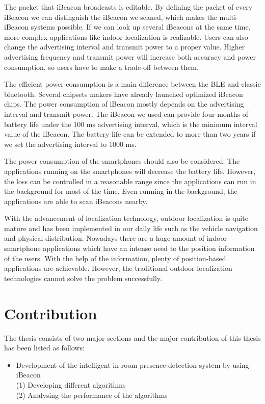 \documentclass[12pt]{report}
\begin{document}
The packet that iBeacon broadcasts is editable. By defining the packet of every iBeacon we can distinguish the iBeacon we scaned, which makes the multi-iBeacon systems possible. If we can look up several iBeacons at the same time, more complex applications like indoor localization is realizable. Users can also change the advertising interval and transmit power to a proper value. Higher advertising frequency and transmit power will increase both accuracy and power consumption, so users have to make a trade-off between them.

The efficient power consumption is a main difference between the BLE and classic bluetooth. Several chipsets makers have already launched optimized iBeacon chips. The power consumption of iBeacon mostly depends on the advertising interval and transmit power. The iBeacon we used can provide four months of battery life under the 100 ms advertising interval, which is the minimum interval value of the iBeacon. The battery life can be extended to more than two years if we set the advertising interval to 1000 ms.

The power consumption of the smartphones should also be considered. The applications running on the smartphones will decrease the battery life. However, the loss can be controlled in a reasonable range since the applications can run in the background for most of the time. Even running in the background, the applications are able to scan iBeacons nearby. 

With the advancement of localization technology, outdoor localization is quite mature and has been implemented in our daily life such as the vehicle navigation and physical distribution. Nowadays there are a huge amount of indoor smartphone applications which have an intense need to the position information of the users. With the help of the information, plenty of position-based applications are achievable. However, the traditional outdoor localization technologies cannot solve the problem successfully. 

\section{Contribution}
The thesis consists of two major sections and the major contribution of this thesis has been listed as follows:

\begin{itemize}
\item Development of the intelligent in-room presence detection system by using iBeacon \\
\hspace{10mm} (1) Developing different algorithms \\
\hspace{10mm} (2) Analysing the performance of the algorithms
\end{itemize}
\end{document}
